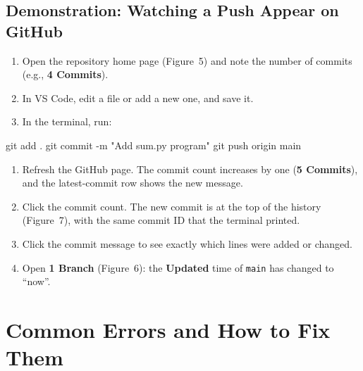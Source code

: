 \documentclass[11pt,a4paper]{article}
\newcommand{\code}[1]{\texttt{#1}}
\begin{document}
\subsection{Demonstration: Watching a Push Appear on GitHub}

\begin{enumerate}
\item Open the repository home page (Figure~5) and note the number of commits (e.g., \textbf{4 Commits}).
\item In VS Code, edit a file or add a new one, and save it.
\item In the terminal, run:
\end{enumerate}
\begin{cmd}
git add .
git commit -m "Add sum.py program"
git push origin main
\end{cmd}
\begin{enumerate}[resume]
\item Refresh the GitHub page. The commit count increases by one (\textbf{5 Commits}), and the latest-commit row shows the new message.
\item Click the commit count. The new commit is at the top of the history (Figure~7), with the same commit ID that the terminal printed.
\item Click the commit message to see exactly which lines were added or changed.
\item Open \textbf{1 Branch} (Figure~6): the \textbf{Updated} time of \code{main} has changed to ``now''.
\end{enumerate}

\section{Common Errors and How to Fix Them}
\label{sec:errors}
\end{document}
